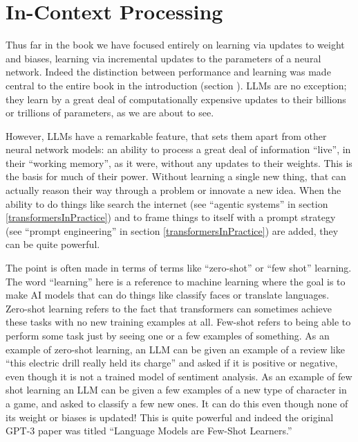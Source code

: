 \section{In-Context Processing}\label{inContext}

Thus far in the book we have focused entirely on learning via updates to weight
and biases, learning via incremental updates to the parameters of a neural
network. Indeed the distinction between performance and learning was made
central to the entire book in the introduction (section
). LLMs are no exception; they learn by a great
deal of computationally expensive updates to their billions or trillions of
parameters, as we are about to see. 

However, LLMs have a remarkable feature, that sets them apart from other neural
network models: an ability to process a great deal of information ``live'', in
their ``working memory'', as it were, without any updates to their weights.
This is the basis for much of their power. Without learning a single new thing,
that can actually reason their way through a problem or innovate a new idea.
When the ability to do things like search the internet (see ``agentic systems''
in section \ref{transformersInPractice}) and to frame things to itself with a
prompt strategy (see ``prompt engineering'' in section
\ref{transformersInPractice}) are added, they can be quite powerful.

The point is often made in terms of terms like ``zero-shot'' or ``few shot''
learning. The word ``learning'' here is a reference to machine learning where
the goal is to make AI models that can do things like classify faces or
translate languages. Zero-shot learning refers to the fact that transformers
can sometimes achieve these tasks with no new training examples at all.
Few-shot refers to being able to perform some task just by seeing one or a few
examples of something.  As an example of zero-shot learning, an LLM can be
given an example of a review like ``this electric drill really held its
charge'' and asked if it is positive or negative, even though it is not a
trained model of sentiment analysis.  As an example of few shot learning an LLM
can be given a few examples of a new type of character in a game, and asked to
classify a few new ones. It can do this even though none of its weight or
biases is updated! This is quite powerful and indeed the original GPT-3 paper
was titled ``Language Models are Few-Shot Learners.''  

